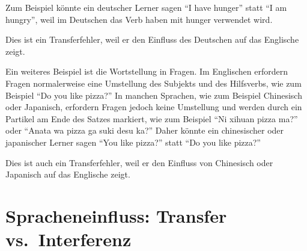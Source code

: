 \documentclass[
  letterpaper,
]{scrbook}
\begin{document}
\begin{tcolorbox}[enhanced jigsaw, arc=.35mm, left=2mm, bottomrule=.15mm, toprule=.15mm, colframe=quarto-callout-note-color-frame, breakable, rightrule=.15mm, opacityback=0, colback=white, leftrule=.75mm]
\begin{minipage}[t]{5.5mm}
\textcolor{quarto-callout-note-color}{\faInfo}
\end{minipage}%
\begin{minipage}[t]{\textwidth - 5.5mm}

Zum Beispiel könnte ein deutscher Lerner sagen ``I have hunger'' statt
``I am hungry'', weil im Deutschen das Verb haben mit hunger verwendet
wird.

\end{minipage}%
\end{tcolorbox}

Dies ist ein Transferfehler, weil er den Einfluss des Deutschen auf das
Englische zeigt.

\begin{tcolorbox}[enhanced jigsaw, arc=.35mm, left=2mm, bottomrule=.15mm, toprule=.15mm, colframe=quarto-callout-note-color-frame, breakable, rightrule=.15mm, opacityback=0, colback=white, leftrule=.75mm]
\begin{minipage}[t]{5.5mm}
\textcolor{quarto-callout-note-color}{\faInfo}
\end{minipage}%
\begin{minipage}[t]{\textwidth - 5.5mm}

Ein weiteres Beispiel ist die Wortstellung in Fragen. Im Englischen
erfordern Fragen normalerweise eine Umstellung des Subjekts und des
Hilfsverbs, wie zum Beispiel ``Do you like pizza?'' In manchen Sprachen,
wie zum Beispiel Chinesisch oder Japanisch, erfordern Fragen jedoch
keine Umstellung und werden durch ein Partikel am Ende des Satzes
markiert, wie zum Beispiel ``Ni xihuan pizza ma?'' oder ``Anata wa pizza
ga suki desu ka?'' Daher könnte ein chinesischer oder japanischer Lerner
sagen ``You like pizza?'' statt ``Do you like pizza?''

\end{minipage}%
\end{tcolorbox}

Dies ist auch ein Transferfehler, weil er den Einfluss von Chinesisch
oder Japanisch auf das Englische zeigt.

\hypertarget{spracheneinfluss-transfer-vs.-interferenz}{%
\section{Spracheneinfluss: Transfer
vs.~Interferenz}\label{spracheneinfluss-transfer-vs.-interferenz}}
\end{document}
